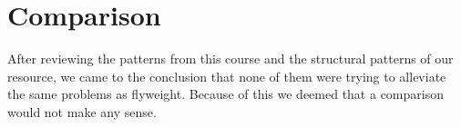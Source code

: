 \section{Comparison}
After reviewing the patterns from this course and the structural patterns of our resource, we came to the conclusion that none of them were trying to alleviate the same problems as flyweight. Because of this we deemed that a comparison would not make any sense.